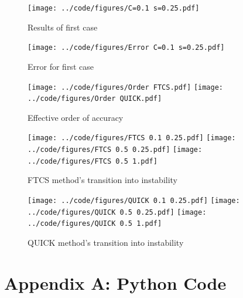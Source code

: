 \documentclass[twocolumn,10pt]{asme2ej}
\begin{document}
\begin{figure}[thb]
\begin{center}
\texttt{[image: ../code/figures/C=0.1 s=0.25.pdf]}
\caption{Results of first case}
\label{base_study}
\end{center}
\end{figure}

\begin{figure}[thb]
\begin{center}
\texttt{[image: ../code/figures/Error C=0.1 s=0.25.pdf]}
\caption{Error for first case}
\label{base_study}
\end{center}
\end{figure}

\begin{figure}[thb]
\begin{center}
\texttt{[image: ../code/figures/Order FTCS.pdf]}
\texttt{[image: ../code/figures/Order QUICK.pdf]}
\caption{Effective order of accuracy}
\label{base_study}
\end{center}
\end{figure}

\begin{figure}[thb]
\begin{center}
\texttt{[image: ../code/figures/FTCS 0.1 0.25.pdf]}
\texttt{[image: ../code/figures/FTCS 0.5 0.25.pdf]}
\texttt{[image: ../code/figures/FTCS 0.5 1.pdf]}
\caption{FTCS method's transition into instability}
\label{base_study}
\end{center}
\end{figure}

\begin{figure}[thb]
\begin{center}
\texttt{[image: ../code/figures/QUICK 0.1 0.25.pdf]}
\texttt{[image: ../code/figures/QUICK 0.5 0.25.pdf]}
\texttt{[image: ../code/figures/QUICK 0.5 1.pdf]}
\caption{QUICK method's transition into instability}
\label{base_study}
\end{center}
\end{figure}


\clearpage
\onecolumn
\appendix       %
\section*{Appendix A: Python Code}




\end{document}
